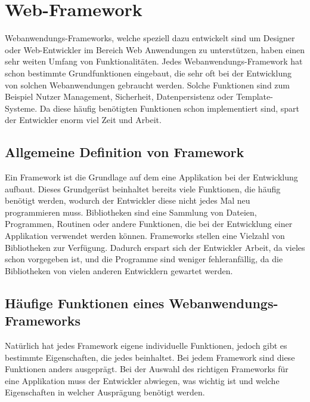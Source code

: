 \section{Web-Framework}

Webanwendungs-Frameworks\cite{WebApplicationFramework}, welche speziell dazu entwickelt sind um Designer oder Web-Entwickler im Bereich Web Anwendungen zu unterstützen, haben einen sehr weiten Umfang von Funktionalitäten. Jedes Webanwendungs-Framework hat schon bestimmte Grundfunktionen eingebaut, die sehr oft bei der Entwicklung von solchen Webanwendungen gebraucht werden. Solche Funktionen sind zum Beispiel Nutzer Management, Sicherheit, Datenpersistenz oder Template-Systeme. Da diese häufig benötigten Funktionen schon implementiert sind, spart der Entwickler enorm viel Zeit und Arbeit.

\subsection{Allgemeine Definition von Framework}

Ein Framework\cite{Framework} ist die Grundlage auf dem eine Applikation bei der Entwicklung aufbaut. Dieses Grundgerüst beinhaltet bereits viele Funktionen, die häufig benötigt werden, wodurch der Entwickler diese nicht jedes Mal neu programmieren muss. Bibliotheken sind eine Sammlung von Dateien, Programmen, Routinen oder andere Funktionen, die bei der Entwicklung einer Applikation verwendet werden können. Frameworks stellen eine Vielzahl von Bibliotheken zur Verfügung. Dadurch erspart sich der Entwickler Arbeit, da vieles schon vorgegeben ist, und die Programme sind weniger fehleranfällig, da die Bibliotheken von vielen anderen Entwicklern gewartet werden.

\subsection{Häufige Funktionen eines Webanwendungs-Frameworks}

Natürlich hat jedes Framework eigene individuelle Funktionen, jedoch gibt es bestimmte Eigenschaften, die jedes beinhaltet. Bei jedem Framework sind diese Funktionen anders ausgeprägt. Bei der Auswahl des richtigen Frameworks für eine Applikation muss der Entwickler abwiegen, was wichtig ist und welche Eigenschaften in welcher Ausprägung benötigt werden.

